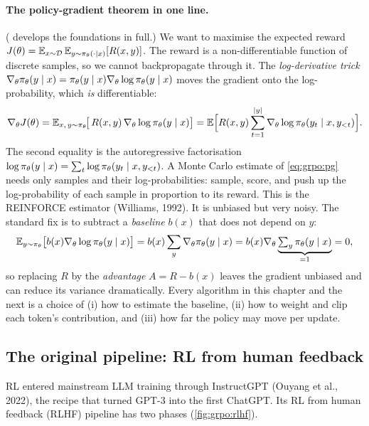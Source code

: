 \paragraph{The policy-gradient theorem in one line.} ( develops the foundations in full.) We want to maximise the expected
reward $J(\theta)=\mathbb{E}_{x\sim\mathcal{D}}\,\mathbb{E}_{y\sim\pi_\theta(\cdot\mid x)}[R(x,y)]$. The
reward is a non-differentiable function of discrete samples, so we cannot backpropagate
through it. The \emph{log-derivative trick}
$\nabla_\theta \pi_\theta(y\mid x)=\pi_\theta(y\mid x)\nabla_\theta\log\pi_\theta(y\mid x)$ moves
the gradient onto the log-probability, which \emph{is} differentiable:
\begin{equation}
\nabla_\theta J(\theta)
 = \mathbb{E}_{x,\,y\sim\pi_\theta}\!\big[\,R(x,y)\,\nabla_\theta\log\pi_\theta(y\mid x)\big]
 = \mathbb{E}\Big[R(x,y)\sum_{t=1}^{|y|}\nabla_\theta\log\pi_\theta(y_t\mid x,y_{<t})\Big].
\label{eq:grpo:pg}
\end{equation}
The second equality is the autoregressive factorisation
$\log\pi_\theta(y\mid x)=\sum_t\log\pi_\theta(y_t\mid x,y_{<t})$. A Monte Carlo estimate of
\cref{eq:grpo:pg} needs only samples and their log-probabilities: sample, score, and push
up the log-probability of each sample in proportion to its reward. This is the REINFORCE
estimator (Williams, 1992). It is unbiased but very noisy. The standard fix is to subtract a
\emph{baseline} $b(x)$ that does not depend on $y$:
\begin{equation}
\mathbb{E}_{y\sim\pi_\theta}\big[b(x)\nabla_\theta\log\pi_\theta(y\mid x)\big]
 = b(x)\sum_y\nabla_\theta\pi_\theta(y\mid x)
 = b(x)\nabla_\theta\underbrace{\textstyle\sum_y\pi_\theta(y\mid x)}_{=1}=0,
\end{equation}
so replacing $R$ by the \emph{advantage} $A=R-b(x)$ leaves the gradient unbiased and can
reduce its variance dramatically. Every algorithm in this chapter and the next is a choice
of (i) how to estimate the baseline, (ii) how to weight and clip each token's contribution,
and (iii) how far the policy may move per update.

\subsection{The original pipeline: RL from human feedback}\label{sec:grpo:rlhf}

RL entered mainstream LLM training through InstructGPT (Ouyang et al., 2022),
the recipe that turned GPT-3 into the first ChatGPT. Its RL from human feedback (RLHF)
pipeline has two phases (\cref{fig:grpo:rlhf}).

